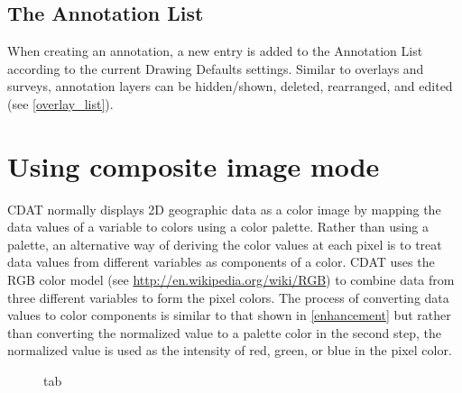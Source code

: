 \subsection{The {\gui Annotation List}}

When creating an annotation, a new entry is added to the
{\gui Annotation List} according to the current {\gui Drawing
Defaults} settings.  Similar to overlays and surveys, annotation
layers can be hidden/shown, deleted, rearranged, and edited (see
\autoref{overlay_list}).

\section{Using composite image mode}

CDAT normally displays 2D geographic data as a color image by
mapping the data values of a variable to colors using a color
palette.  Rather than using a palette, an alternative way of
deriving the color values at each pixel is to treat data values
from different variables as components of a color.  CDAT uses the
RGB color model (see \url{http://en.wikipedia.org/wiki/RGB}) to
combine data from three different variables to form the pixel
colors.  The process of converting data values to color
components is similar to that shown in \autoref{enhancement} but
rather than converting the normalized value to a palette color in
the second step, the normalized value is used as the intensity of
red, green, or blue in the pixel color.  

\begin{figure}
  \begin{center}
    \caption[Color Composite tab]{
        tab
    }
    \label{composite_tab}
  \end{center}
\end{figure}

